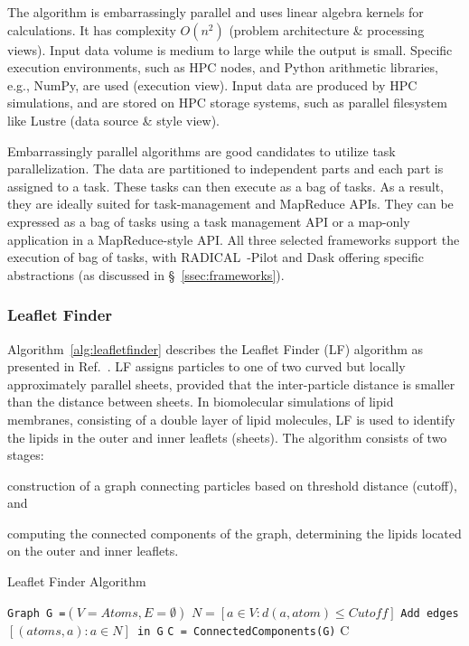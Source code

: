 The algorithm is embarrassingly parallel and uses linear algebra kernels for calculations.
It has complexity $O(n^2)$ (problem architecture \& processing views).
Input data volume is medium to large while the output is small.
Specific execution environments, such as HPC nodes, and Python arithmetic libraries, e.g., NumPy, are used (execution view).
Input data are produced by HPC simulations, and are stored on HPC storage systems, such as parallel filesystem like Lustre (data source \& style view).

Embarrassingly parallel algorithms are good candidates to utilize task parallelization.
The data are partitioned to independent parts and each part is assigned to a task.
These tasks can then execute as a bag of tasks.
As a result, they are ideally suited for task-management and MapReduce APIs.
They can be expressed as a bag of tasks using a task management API or a map-only application in a MapReduce-style API.
All three selected frameworks support the execution of bag of tasks, with RADICAL~-Pilot and Dask offering specific abstractions (as discussed in \S~\ref{ssec:frameworks}).

\subsubsection*{Leaflet Finder}Algorithm~\ref{alg:leafletfinder} describes the Leaflet Finder (LF) algorithm as presented in Ref.~\cite{michaud2011mdanalysis}.
LF assigns particles to one of two curved but locally approximately parallel sheets, provided that the inter-particle distance is smaller than the distance between sheets.
In biomolecular simulations of lipid membranes, consisting of a double layer of lipid molecules, LF is used to identify the lipids in the outer and inner leaflets (sheets).
The algorithm consists of two stages:
\begin{inparaenum}[a)]
    \item construction of a graph connecting particles based on threshold distance (cutoff), and
    \item computing the connected components of the graph, determining the lipids located on the outer and inner leaflets.
\end{inparaenum}

\begin{algorithm}[t]
    \scriptsize
    \caption{Leaflet Finder Algorithm}
    \label{alg:leafletfinder}
    \begin{algorithmic}[1]
        \State \texttt{Graph G =$(V=Atoms,E=\emptyset)$}
        \State \texttt{$N = [a\in V: d(a,atom)\le Cutoff]$}
        \State \texttt{Add edges $[(atoms,a): a \in N]$ in G}
        \EndFor
        \State \texttt{C = ConnectedComponents(G)}
        \State \Return C
        \EndProcedure
    \end{algorithmic}
\end{algorithm}

